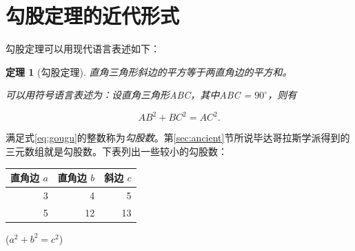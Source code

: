 \documentclass[UTF8]{ctexart}
\newtheorem{thm}{定理}
\newcommand\degree{^\circ}
\begin{document}
\section{勾股定理的近代形式}
勾股定理可以用现代语言表述如下：

\begin{thm}[勾股定理]
直角三角形斜边的平方等于两直角边的平方和。

可以用符号语言表述为：设直角三角形ABC，其中\angle ABC = $90\degree$，则有

\begin{equation}\label{eq:gougu}
AB^2 + BC^2 = AC^2.
\end{equation}
\end{thm}

满足式\eqref{eq:gougu}的整数称为\emph{勾股数}。第\ref{sec:ancient}节所说毕达哥拉斯学派得到的三元数组就是勾股数。下表列出一些较小的勾股数：

\begin{table}[H]
\begin{tabular}{|rrr|}
\hline
直角边 $a$ & 直角边 $b$ & 斜边 $c$\\
\hline
3 & 4  & 5 \\
5 & 12 & 13\\
\hline
\end{tabular}%
\qquad
($a^2 + b^2 = c^2$)
\end{table}

\nocite{Shiye}

\end{document}
